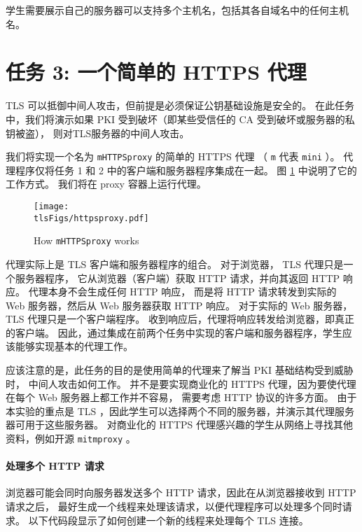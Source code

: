 学生需要展示自己的服务器可以支持多个主机名，包括其各自域名中的任何主机名。



\section{任务 3: 一个简单的 HTTPS 代理}


TLS 可以抵御中间人攻击，但前提是必须保证公钥基础设施是安全的。
在此任务中，我们将演示如果 PKI 受到破坏（即某些受信任的 CA 受到破坏或服务器的私钥被盗），
则对TLS服务器的中间人攻击。

我们将实现一个名为 \texttt{mHTTPSproxy} 的简单的 HTTPS 代理
（ \texttt{m} 代表 \texttt{mini} ）。
代理程序仅将任务 1 和 2 中的客户端和服务器程序集成在一起。
图 \ref{tls:fig:proxy} 中说明了它的工作方式。
我们将在 proxy 容器上运行代理。


\begin{figure}[htb]
\centering
\texttt{[image: \\tlsFigs/httpsproxy.pdf]}
\caption{How \texttt{mHTTPSproxy} works}
\label{tls:fig:proxy}
\end{figure}

代理实际上是 TLS 客户端和服务器程序的组合。
对于浏览器， TLS 代理只是一个服务器程序，
它从浏览器（客户端）获取 HTTP 请求，并向其返回 HTTP 响应。
代理本身不会生成任何 HTTP 响应，
而是将 HTTP 请求转发到实际的 Web 服务器，然后从 Web 服务器获取 HTTP 响应。
对于实际的 Web 服务器， TLS 代理只是一个客户端程序。
收到响应后，代理将响应转发给浏览器，即真正的客户端。
因此，通过集成在前两个任务中实现的客户端和服务器程序，学生应该能够实现基本的代理工作。

应该注意的是，此任务的目的是使用简单的代理来了解当 PKI 基础结构受到威胁时，
中间人攻击如何工作。
并不是要实现商业化的 HTTPS 代理，因为要使代理在每个 Web 服务器上都工作并不容易，
需要考虑 HTTP 协议的许多方面。
由于本实验的重点是 TLS ，因此学生可以选择两个不同的服务器，并演示其代理服务器可用于这些服务器。
对商业化的 HTTPS 代理感兴趣的学生从网络上寻找其他资料，例如开源 \texttt{mitmproxy} 。


\paragraph{处理多个 HTTP 请求}
浏览器可能会同时向服务器发送多个 HTTP 请求，因此在从浏览器接收到 HTTP 请求之后，
最好生成一个线程来处理该请求，以便代理程序可以处理多个同时请求。
以下代码段显示了如何创建一个新的线程来处理每个 TLS 连接。

